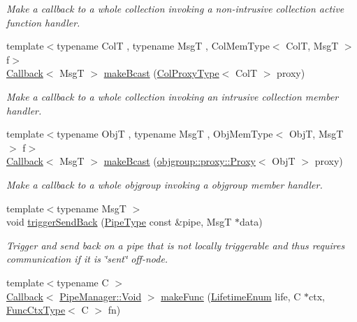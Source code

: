 \begin{DoxyCompactItemize}
\begin{DoxyCompactList}\small\item\em Make a callback to a whole collection invoking a non-\/intrusive collection active function handler. \end{DoxyCompactList}\item 
{\footnotesize template$<$typename ColT , typename MsgT , Col\+Mem\+Type$<$ Col\+T, Msg\+T $>$ f$>$ }\\\hyperlink{namespacevt_a36db99df4c973d48b1118a293fff533f}{Callback}$<$ MsgT $>$ \hyperlink{structvt_1_1pipe_1_1_pipe_manager_a6fb7d87f8beb2c1e80d492df47036158}{make\+Bcast} (\hyperlink{structvt_1_1pipe_1_1_pipe_manager_t_l_af56c58cad882496e35f01227d4da3898}{Col\+Proxy\+Type}$<$ ColT $>$ proxy)
\begin{DoxyCompactList}\small\item\em Make a callback to a whole collection invoking an intrusive collection member handler. \end{DoxyCompactList}\item 
{\footnotesize template$<$typename ObjT , typename MsgT , Obj\+Mem\+Type$<$ Obj\+T, Msg\+T $>$ f$>$ }\\\hyperlink{namespacevt_a36db99df4c973d48b1118a293fff533f}{Callback}$<$ MsgT $>$ \hyperlink{structvt_1_1pipe_1_1_pipe_manager_a4d561c17ce6861401a32892223e434c9}{make\+Bcast} (\hyperlink{structvt_1_1objgroup_1_1proxy_1_1_proxy}{objgroup\+::proxy\+::\+Proxy}$<$ ObjT $>$ proxy)
\begin{DoxyCompactList}\small\item\em Make a callback to a whole objgroup invoking a objgroup member handler. \end{DoxyCompactList}\item 
{\footnotesize template$<$typename MsgT $>$ }\\void \hyperlink{structvt_1_1pipe_1_1_pipe_manager_aaddd05d4eec8fbcbe8134f9c907a7306}{trigger\+Send\+Back} (\hyperlink{namespacevt_ac9852acda74d1896f48f406cd72c7bd3}{Pipe\+Type} const \&pipe, MsgT $\ast$data)
\begin{DoxyCompactList}\small\item\em Trigger and send back on a pipe that is not locally triggerable and thus requires communication if it is \char`\"{}sent\char`\"{} off-\/node. \end{DoxyCompactList}\item 
{\footnotesize template$<$typename C $>$ }\\\hyperlink{namespacevt_a36db99df4c973d48b1118a293fff533f}{Callback}$<$ \hyperlink{structvt_1_1pipe_1_1_pipe_manager_ab720c2580ecfd3ab36e49aeaaff64cc6}{Pipe\+Manager\+::\+Void} $>$ \hyperlink{structvt_1_1pipe_1_1_pipe_manager_a51d552105b29056f146fecab880eb6c4}{make\+Func} (\hyperlink{namespacevt_1_1pipe_acb42b284378c0fdac1d7c6335dc26f58}{Lifetime\+Enum} life, C $\ast$ctx, \hyperlink{structvt_1_1pipe_1_1_pipe_manager_base_ad8463823b6b4cfdb67c119d6d22e3bac}{Func\+Ctx\+Type}$<$ C $>$ fn)

\end{DoxyCompactItemize}
